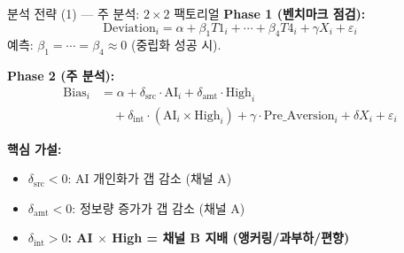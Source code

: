 \documentclass[aspectratio=169]{beamer}
\begin{document}
\begin{frame}{분석 전략 (1) --- 주 분석: $2\times2$ 팩토리얼}
  \textbf{Phase 1 (벤치마크 점검):}
  \[
    \mathrm{Deviation}_i = \alpha + \beta_1 T1_i + \cdots + \beta_4 T4_i + \gamma X_i + \varepsilon_i
  \]
  예측: $\beta_1 = \cdots = \beta_4 \approx 0$ (중립화 성공 시).

  \vspace{0.4em}
  \textbf{Phase 2 (주 분석):}
  \begin{align*}
    \mathrm{Bias}_i &= \alpha + \delta_{\text{src}} \cdot \mathrm{AI}_i + \delta_{\text{amt}} \cdot \mathrm{High}_i \\
                    &\quad + \delta_{\text{int}} \cdot (\mathrm{AI}_i \times \mathrm{High}_i)
                              + \gamma \cdot \mathrm{Pre\_Aversion}_i + \delta X_i + \varepsilon_i
  \end{align*}

  \textbf{핵심 가설:}
  \begin{itemize}
    \item $\delta_{\text{src}} < 0$: AI 개인화가 갭 감소 (채널 A)
    \item $\delta_{\text{amt}} < 0$: 정보량 증가가 갭 감소 (채널 A)
    \item \textbf{$\delta_{\text{int}} > 0$: AI $\times$ High = 채널 B 지배 (앵커링/과부하/편향)}
  \end{itemize}
\end{frame}
\end{document}
